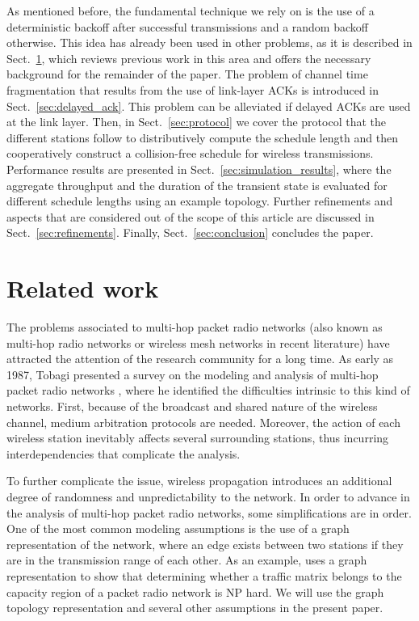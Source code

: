 \documentclass[twocolumn]{svjour3}          \smartqed  \usepackage{graphicx}
\begin{document}
As mentioned before, the fundamental technique we rely on is the use of a deterministic backoff after successful transmissions and a random backoff otherwise.
This idea has already been used in other problems, as it is described in Sect.~\ref{sec:related_work}, which reviews previous work in this area and offers the necessary background for the remainder of the paper.
The problem of channel time fragmentation that results from the use of link-layer ACKs is introduced in Sect.~\ref{sec:delayed_ack}.
This problem can be alleviated if delayed ACKs are used at the link layer.
Then, in Sect.~\ref{sec:protocol} we cover the protocol that the different stations follow to distributively compute the schedule length and then cooperatively construct a collision-free schedule for wireless transmissions.
Performance results are presented in Sect.~\ref{sec:simulation_results}, where the aggregate throughput and the duration of the transient state is evaluated for different schedule lengths using an example topology.
Further refinements and aspects that are considered out of the scope of this article are discussed in Sect.~\ref{sec:refinements}.
Finally, Sect.~\ref{sec:conclusion} concludes the paper.

\section{Related work}
\label{sec:related_work}

The problems associated to multi-hop packet radio networks (also known as multi-hop radio networks or wireless mesh networks in recent literature) have attracted the attention of the research community for a long time.
As early as 1987, Tobagi presented a survey on the modeling and analysis of multi-hop packet radio networks \cite{tobagi1987mpa}, where he identified the difficulties intrinsic to this kind of networks.
First, because of the broadcast and shared nature of the wireless channel, medium arbitration protocols are needed.
Moreover, the action of each wireless station inevitably affects several surrounding stations, thus incurring interdependencies that complicate the analysis.

To further complicate the issue, wireless propagation introduces an additional degree of randomness and unpredictability to the network.
In order to advance in the analysis of multi-hop packet radio networks, some simplifications are in order.
One of the most common modeling assumptions is the use of a graph representation of the network, where an edge exists between two stations if they are in the transmission range of each other.
As an example, \cite{arikan1984scr} uses a graph representation to show that determining whether a traffic matrix belongs to the capacity region of a packet radio network is NP hard.
We will use the graph topology representation and several other assumptions in the present paper.
\end{document}
